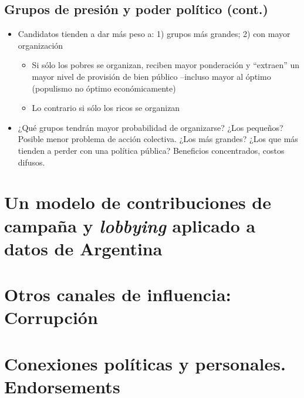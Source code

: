 \documentclass[
  letterpaper,
  DIV=11,
  numbers=noendperiod]{scrartcl}
\providecommand{\tightlist}{%
  \setlength{\itemsep}{0pt}\setlength{\parskip}{0pt}}\usepackage{longtable,booktabs,array}
\begin{document}
\subsection{Grupos de presión y poder político
(cont.)}\label{grupos-de-presiuxf3n-y-poder-poluxedtico-cont.-11}

\begin{itemize}
\tightlist
\item
  Candidatos tienden a dar más peso a: 1) grupos más grandes; 2) con
  mayor organización

  \begin{itemize}
  \tightlist
  \item
    Si sólo los pobres se organizan, reciben mayor ponderación y
    ``extraen'' un mayor nivel de provisión de bien público --incluso
    mayor al óptimo (populismo no óptimo económicamente)
  \item
    Lo contrario si sólo los ricos se organizan
  \end{itemize}
\item
  ¿Qué grupos tendrán mayor probabilidad de organizarse? ¿Los pequeños?
  Posible menor problema de acción colectiva. ¿Los más grandes? ¿Los que
  más tienden a perder con una política pública? Beneficios
  concentrados, costos difusos.
\end{itemize}

\section{\texorpdfstring{\textbf{Un modelo de contribuciones de campaña
y \emph{lobbying} aplicado a datos de
Argentina}}{Un modelo de contribuciones de campaña y lobbying aplicado a datos de Argentina}}\label{un-modelo-de-contribuciones-de-campauxf1a-y-lobbying-aplicado-a-datos-de-argentina}

\section{\texorpdfstring{\textbf{Otros canales de influencia:
Corrupción}}{Otros canales de influencia: Corrupción}}\label{otros-canales-de-influencia-corrupciuxf3n}

\section{\texorpdfstring{\textbf{Conexiones políticas y personales.
Endorsements}}{Conexiones políticas y personales. Endorsements}}\label{conexiones-poluxedticas-y-personales.-endorsements}
\end{document}
